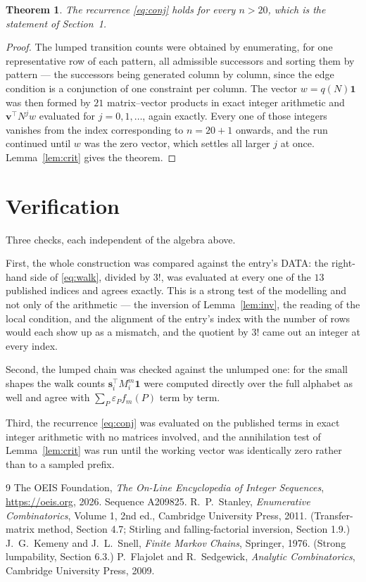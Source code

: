 \documentclass[11pt,a4paper]{article}
\theoremstyle{plain}
\newtheorem{theorem}{Theorem}
\theoremstyle{definition}
\begin{document}
\begin{theorem}
The recurrence \eqref{eq:conj} holds for every $n>20$, which is the statement of
Section~1.
\end{theorem}

\begin{proof}
The lumped transition counts were obtained by enumerating, for one representative row of
each pattern, all admissible successors and sorting them by pattern --- the successors being
generated column by column, since the edge condition is a conjunction of one constraint per
column. The vector $w=q(N)\mathbf{1}$ was then formed by $21$ matrix--vector products
in exact integer arithmetic and $\mathbf{v}^{\!\top}N^{j}w$ evaluated for
$j=0,1,\dots$, again exactly. Every one of those integers vanishes from the index
corresponding to $n=20+1$ onwards, and the run continued until $w$ was the zero vector,
which settles all larger $j$ at once. Lemma~\ref{lem:crit} gives the theorem.
\end{proof}

\section{Verification}

Three checks, each independent of the algebra above.

First, the whole construction was compared against the entry's DATA: the right-hand side of
\eqref{eq:walk}, divided by $3!$, was evaluated at every one of the $13$
published indices and agrees exactly. This is a strong test of the modelling and not only of
the arithmetic --- the inversion of Lemma~\ref{lem:inv}, the reading of the local
condition, and the alignment of the entry's index with the number of rows would each
show up as a mismatch, and the quotient by $3!$ came out an integer at every index.

Second, the lumped chain was checked against the unlumped one: for the small shapes the walk
counts $\mathbf{s}_i^{\!\top}M_i^{m}\mathbf{1}$ were computed directly over the full
alphabet as well and agree with $\sum_P\varepsilon_Pf_m(P)$ term by term.

Third, the recurrence \eqref{eq:conj} was evaluated on the published terms in exact integer
arithmetic with no matrices involved, and the annihilation test of Lemma~\ref{lem:crit} was
run until the working vector was identically zero rather than to a sampled prefix.

\begin{thebibliography}{9}
 The OEIS Foundation, \emph{The On-Line Encyclopedia of Integer
Sequences}, \url{https://oeis.org}, 2026. Sequence A209825.
 R.~P.~Stanley, \emph{Enumerative Combinatorics}, Volume 1, 2nd ed.,
Cambridge University Press, 2011. (Transfer-matrix method, Section 4.7; Stirling and
falling-factorial inversion, Section 1.9.)
 J.~G.~Kemeny and J.~L.~Snell, \emph{Finite Markov Chains}, Springer,
1976. (Strong lumpability, Section 6.3.)
 P.~Flajolet and R.~Sedgewick, \emph{Analytic Combinatorics}, Cambridge
University Press, 2009.
\end{thebibliography}
\end{document}
